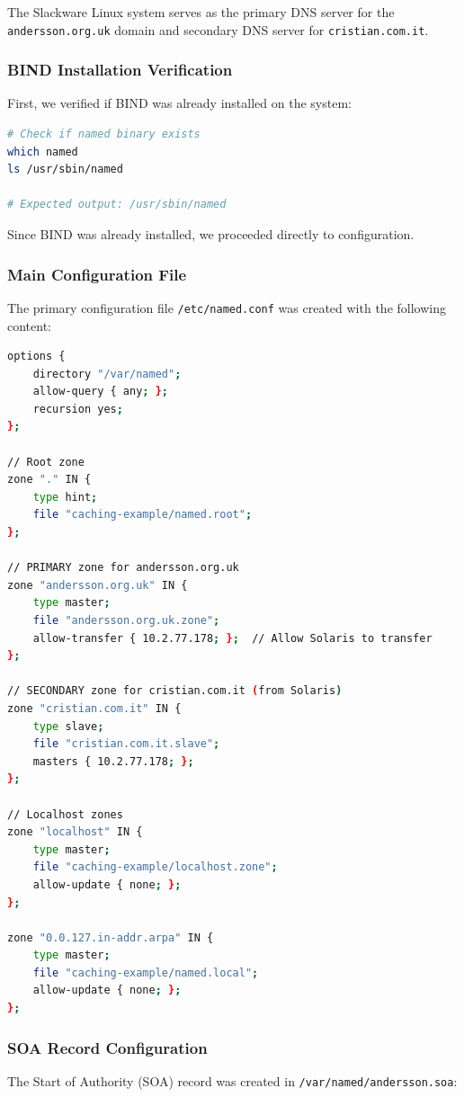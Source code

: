 \documentclass[12pt,a4paper]{article}
\begin{document}
The Slackware Linux system serves as the primary DNS server for the \texttt{andersson.org.uk} domain and secondary DNS server for \texttt{cristian.com.it}.

\subsubsection{BIND Installation Verification}
First, we verified if BIND was already installed on the system:

\begin{lstlisting}[language=bash, caption=Checking BIND Installation]
# Check if named binary exists
which named
ls /usr/sbin/named

# Expected output: /usr/sbin/named
\end{lstlisting}

Since BIND was already installed, we proceeded directly to configuration.

\subsubsection{Main Configuration File}
The primary configuration file \texttt{/etc/named.conf} was created with the following content:

\begin{lstlisting}[language=bash, caption=Slackware named.conf Configuration]
options {
    directory "/var/named";
    allow-query { any; };
    recursion yes;
};

// Root zone
zone "." IN {
    type hint;
    file "caching-example/named.root";
};

// PRIMARY zone for andersson.org.uk
zone "andersson.org.uk" IN {
    type master;
    file "andersson.org.uk.zone";
    allow-transfer { 10.2.77.178; };  // Allow Solaris to transfer
};

// SECONDARY zone for cristian.com.it (from Solaris)
zone "cristian.com.it" IN {
    type slave;
    file "cristian.com.it.slave";
    masters { 10.2.77.178; };
};

// Localhost zones
zone "localhost" IN {
    type master;
    file "caching-example/localhost.zone";
    allow-update { none; };
};

zone "0.0.127.in-addr.arpa" IN {
    type master;
    file "caching-example/named.local";
    allow-update { none; };
};
\end{lstlisting}

\subsubsection{SOA Record Configuration}
The Start of Authority (SOA) record was created in \texttt{/var/named/andersson.soa}:
\end{document}
